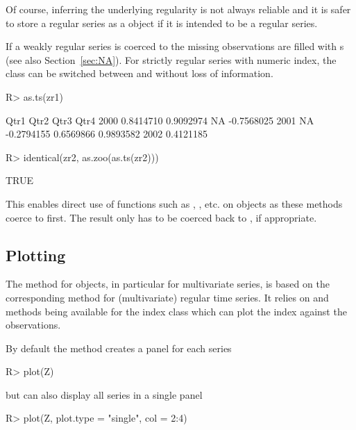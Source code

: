 \documentclass[article,nojss]{jss}
\begin{document}
Of course, inferring the underlying regularity is not always reliable and it is safer
to store a regular series as a  object if it is intended to be a regular series.

If a weakly regular series is coerced to  the missing observations are filled
with s (see also Section~\ref{sec:NA}).
For strictly regular series with numeric index, the class can be switched
between  and  without loss of information.

\begin{Schunk}
\begin{Sinput}
R> as.ts(zr1)
\end{Sinput}
\begin{Soutput}
           Qtr1       Qtr2       Qtr3       Qtr4
2000  0.8414710  0.9092974         NA -0.7568025
2001         NA -0.2794155  0.6569866  0.9893582
2002  0.4121185                                 
\end{Soutput}
\begin{Sinput}
R> identical(zr2, as.zoo(as.ts(zr2)))
\end{Sinput}
\begin{Soutput}
[1] TRUE
\end{Soutput}
\end{Schunk}

This enables direct use of functions such as , ,  etc. on 
objects as these methods coerce to  first. 
The result only has to be coerced back to , if appropriate.
 
 
\subsection{Plotting}
\label{sec:plot}

The  method for  objects, in particular for
multivariate  series, is based on the corresponding
method for (multivariate) regular time series. It relies on 
and  methods being available for the index class which can
plot the index against the observations.

By default the  method creates a panel for each series
\begin{Schunk}
\begin{Sinput}
R> plot(Z)
\end{Sinput}
\end{Schunk}
but can also display all series in a single panel
\begin{Schunk}
\begin{Sinput}
R> plot(Z, plot.type = "single", col = 2:4)
\end{Sinput}
\end{Schunk}
\end{document}
